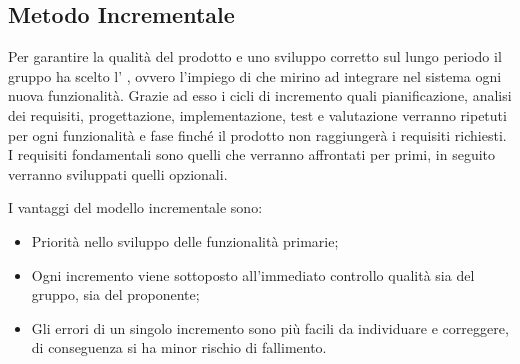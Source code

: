 \documentclass[../piano_di_progetto.tex]{subfiles}
\begin{document}
\subsection{Metodo Incrementale}
\label{sub:incr}

Per garantire la qualità del prodotto e uno sviluppo corretto sul lungo periodo il gruppo ha scelto l’ , ovvero l'impiego di  che mirino ad integrare nel sistema ogni nuova funzionalità. Grazie ad esso i cicli di incremento quali pianificazione, analisi dei requisiti, progettazione, implementazione, test e valutazione verranno ripetuti per ogni funzionalità e fase finché il prodotto non raggiungerà i requisiti richiesti. I requisiti fondamentali sono quelli che verranno affrontati per primi, in seguito verranno sviluppati quelli opzionali.

I vantaggi del modello incrementale sono:
\begin{itemize}
    \item Priorità nello sviluppo delle funzionalità primarie;
    \item Ogni incremento viene sottoposto all’immediato controllo qualità sia del gruppo, sia del proponente;
    \item Gli errori di un singolo incremento sono più facili da individuare e correggere, di conseguenza si ha minor rischio di fallimento.
\end{itemize}
\end{document}
